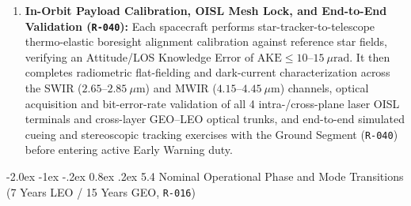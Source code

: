 \documentclass[11pt,a4paper]{article}
\makeatletter
\renewcommand\subsubsection{\@startsection{subsubsection}{3}{\z@}%
    {-2.0ex \@plus -1ex \@minus -.2ex}%
    {0.8ex \@plus .2ex}%
    {\normalfont\normalsize\bfseries\sffamily\color{SubHeadingBlue}}}
\providecommand{\abbr}[1]{#1}
\makeatother
\begin{document}
\begin{enumerate}
    \item \textbf{In-Orbit Payload Calibration, \abbr{OISL} Mesh Lock, and End-to-End Validation (\texttt{R-040}):} Each spacecraft performs star-tracker-to-telescope thermo-elastic boresight alignment calibration against reference star fields, verifying an Attitude/\abbr{LOS} Knowledge Error of $\text{AKE} \le 10\text{--}15~\mu\mathrm{rad}$. It then completes radiometric flat-fielding and dark-current characterization across the \abbr{SWIR} ($2.65\text{--}2.85~\mu\mathrm{m}$) and \abbr{MWIR} ($4.15\text{--}4.45~\mu\mathrm{m}$) channels, optical acquisition and bit-error-rate validation of all 4 intra-/cross-plane laser \abbr{OISL} terminals and cross-layer \abbr{GEO}--\abbr{LEO} optical trunks, and end-to-end simulated cueing and stereoscopic tracking exercises with the Ground Segment (\texttt{R-040}) before entering active Early Warning duty.
\end{enumerate}

\subsubsection{5.4 Nominal Operational Phase and Mode Transitions (7 Years LEO / 15 Years GEO, \texttt{R-016})}
\end{document}
